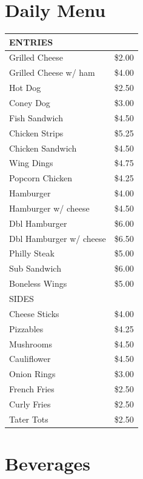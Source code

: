 \documentclass{tufte-handout}
\begin{document}
\section{Daily Menu}
\begin{center}
\begin{tabular}{ll}
\hline
ENTRIES & \\
\hline
Grilled Cheese & \$2.00\\
Grilled Cheese w/ ham & \$4.00\\
Hot Dog & \$2.50\\
Coney Dog & \$3.00\\
Fish Sandwich & \$4.50\\
Chicken Strips & \$5.25\\
Chicken Sandwich & \$4.50\\
Wing Dings & \$4.75\\
Popcorn Chicken & \$4.25\\
Hamburger & \$4.00\\
Hamburger w/ cheese & \$4.50\\
Dbl Hamburger & \$6.00\\
Dbl Hamburger w/ cheese & \$6.50\\
Philly Steak & \$5.00\\
Sub Sandwich & \$6.00\\
Boneless Wings & \$5.00\\
\hline
SIDES & \\
\hline
Cheese Sticks & \$4.00\\
Pizzables & \$4.25\\
Mushrooms & \$4.50\\
Cauliflower & \$4.50\\
Onion Rings & \$3.00\\
French Fries & \$2.50\\
Curly Fries & \$2.50\\
Tater Tots & \$2.50\\
\hline
\end{tabular}
\end{center}


\section{Beverages}
\end{document}
